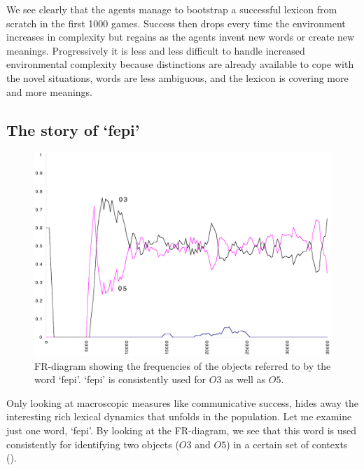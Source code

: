 We see clearly that the agents manage to bootstrap 
a successful lexicon from scratch in the first 1000 
games. Success then drops every time
the environment increases in complexity but regains as the 
agents invent new words or create new meanings. Progressively 
it is less and less difficult to handle increased
environmental complexity because distinctions are 
already available to cope with the novel
situations, words are less ambiguous, 
and the lexicon is covering more and more meanings. 

\subsection{The story of `fepi'}

\begin{figure}[htbp]
  \centerline{\includegraphics[width=.80\textwidth]{chap7/figs/FR-FEPI}}
\caption{ \label{fr-fepi} FR-diagram showing the frequencies
of the objects referred to by the word
`fepi'. `fepi' is consistently used for $O3$ as well as
$O5$.}
\end{figure}
Only looking at macroscopic measures like communicative
success, hides away the
interesting rich lexical dynamics that unfolds
in the population. Let me examine just one word, `fepi'. 
By looking at the FR-diagram, we see that this word is 
used consistently for identifying two objects
($O3$ and $O5$) in a certain set of contexts
(). 

